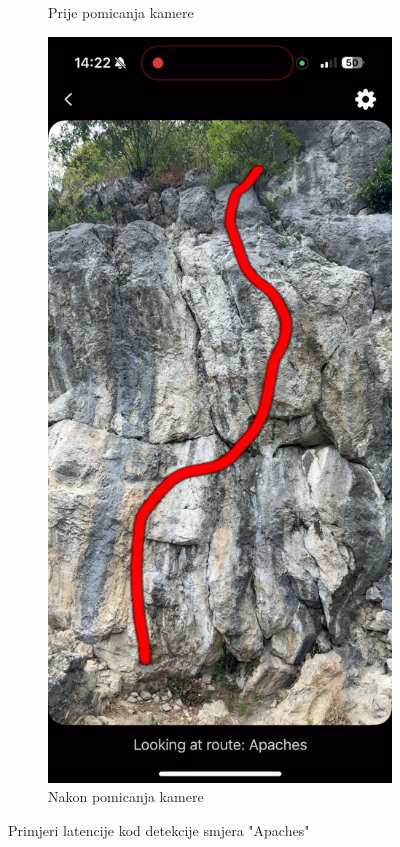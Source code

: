 \begin{figure}[H]
\begin{subfigure}[b]{0.45\textwidth}
        \caption{Prije pomicanja kamere}
        \label{fig:apaches_latency_before}
    \end{subfigure}
    \hfill
    \begin{subfigure}[b]{0.45\textwidth}
        \centering
        \includegraphics[width=\textwidth]{images/testiranje/apaches_latency_after.png}
        \caption{Nakon pomicanja kamere}
        \label{fig:apaches_latency_after}
    \end{subfigure}
    \caption{Primjeri latencije kod detekcije smjera "Apaches"}
    \label{fig:apaches_latency_double}
\end{figure}

